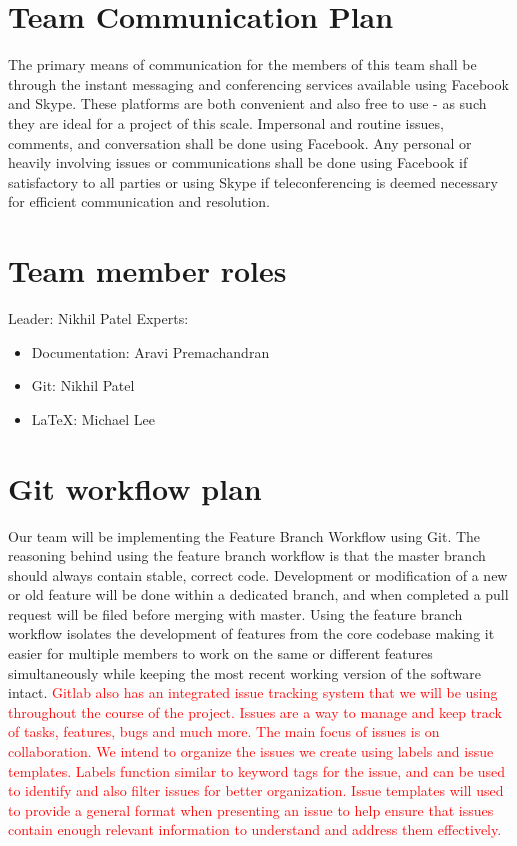\documentclass{article}
\begin{document}
\section{Team Communication Plan}

\indent The primary means of communication for the members of this team shall
be through the instant messaging and conferencing services available using
Facebook and Skype. These platforms are both convenient and also free to use -
as such they are ideal for a project of this scale. Impersonal and routine
issues, comments, and conversation shall be done using Facebook. Any personal or
heavily involving issues or communications shall be done using Facebook if
satisfactory to all parties or using Skype if teleconferencing is deemed
necessary for efficient communication and resolution.

\newpage

\section{Team member roles}

\noindent Leader: Nikhil Patel \newline \noindent Experts: \vspace{-2mm}
\begin{itemize} \itemsep0em \item Documentation: Aravi Premachandran \item Git:
Nikhil Patel \item LaTeX: Michael Lee \end{itemize}

\section{Git workflow plan}

\indent Our team will be implementing the Feature Branch Workflow using Git.
The reasoning behind using the feature branch workflow is that the master branch
should always contain stable, correct code. Development or modification of a new
or old feature will be done within a dedicated branch, and when completed a pull
request will be filed before merging with master. Using the feature branch
workflow isolates the development of features from the core codebase making it
easier for multiple members to work on the same or different features
simultaneously while keeping the most recent working version of the software
intact.\newline
\indent \textcolor{red}{Gitlab also has an integrated issue tracking system that we will be
using throughout the course of the project. Issues are a way to manage and keep
track of tasks, features, bugs and much more. The main focus of issues is on
collaboration. We intend to organize the issues we create using labels and
issue templates.  Labels function similar to keyword tags for the issue, and
can be used to identify and also filter issues for better organization. Issue
templates will used to provide a general format when presenting an issue to
help ensure that issues contain enough relevant information to understand and
address them effectively.}
\end{document}
